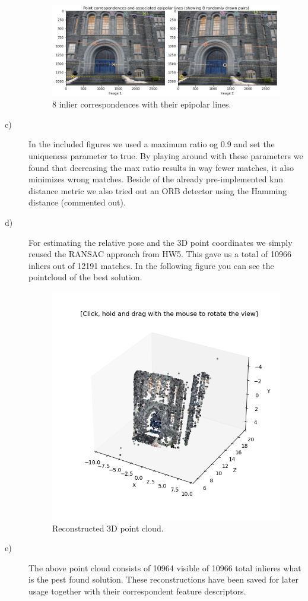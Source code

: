 \documentclass[a4paper]{article} %
\begin{document}
\begin{description}
            \begin{figure}[H]
                \center
                \includegraphics[width= \linewidth]{epipolarLines}
                \caption{8 inlier correspondences with their epipolar lines.}
            \end{figure}
        \item [c)]  In the included figures we used a maximum ratio og 0.9 and set the uniqueness parameter to true.
                    By playing around with these parameters we found that decreasing the max ratio results in way fewer matches, it also minimizes wrong matches.
                    Beside of the already pre-implemented knn distance metric we also tried out an ORB detector using the Hamming distance (commented out).
        \item [d)]  For estimating the relative pose and the 3D point coordinates we simply reused the RANSAC approach from HW5.
                    This gave us a total of 10966 inliers out of 12191 matches.
                    In the following figure you can see the pointcloud of the best solution.
            \begin{figure}[h]
                \center
                \includegraphics[width= 0.7 \linewidth ]{3D_point_cloud}
                \caption{Reconstructed 3D point cloud.}
            \end{figure}
        \item [e)]  The above point cloud consists of 10964 visible of 10966 total inlieres what is the pest found solution.
                    These reconstructions have been saved for later usage together with their correspondent feature descriptors.

    \end{description}
    
\end{document}
